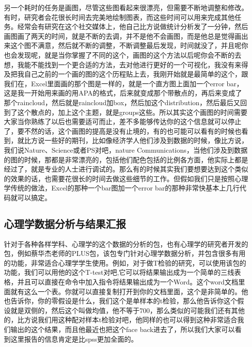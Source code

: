 \documentclass[
  oneside]{book}
\begin{document}
另一个耗时的任务是画图，尽管这些图看起来很漂亮，但需要不断地调整和修改。有时，研究者会花很长时间去完美地绘制图表，而这些时间可以用来完成其他任务。经常会有研究在这个社交媒体上，他自己比方说做统计分析发了一分钟，然后画图画了两天的时间，就是不断的去调，并不是他不会画图，而是他总是觉得画出来这个图不满意，然后就不断的调整，不断调整最后发现，时间就没了，并且呢你也会发现呢，就是当你掌握了不同的这个，画图的这个方法以后呢你会不断的去想，我能不能找到一个更合适的方法，去对他进行更好的一个可视化，我没有来得及把我自己之前的一个画的图的这个历程贴上去，我刚开始就是最简单的这个，跟我们在，Excel里面画的那个图是一样的，就是一个直方图上面加一个error bar，这是我一开始用来画的用APA的格式，后来就变成那个带散点的，再后来变成了那个raincloud，然后就是raincloud加box，然后加这个distribution，然后最后又回到了这个散点的，加上这个主题，就是groups这些。所以其实这个画图的时间需要大家当你熟练了以后也需要适可而止，差不多能够传达你的这个信息就可以停止了，要不然的话，这个画图的提高是没有止境的，有的也可能可以看有的时候也看到，就比方说一些好的期刊，比如像经济学人他们涉及到数据的时候，像比方说，我们说Nature、Science或者PS对吧，nature Communications，当他们涉及到数据的图的时候，那都是非常漂亮的，包括他们配色包括的比例各方面，他实际上都是经过了，就是专业的人士进行调试的。那么有的时候其实我们要想要达到这个类似的效果的话，也需要花很长的时间去做这些细节的工作。但假如我们只是按照心理学传统的做法，Excel的那种一个bar图加一个error bar的那种非常快基本上几行代码就可以搞定。

\hypertarget{ux5fc3ux7406ux5b66ux6570ux636eux5206ux6790ux4e0eux7ed3ux679cux6c47ux62a5}{%
\subsection{心理学数据分析与结果汇报}\label{ux5fc3ux7406ux5b66ux6570ux636eux5206ux6790ux4e0eux7ed3ux679cux6c47ux62a5}}

针对于各种各样学科、心理学的这个数据的分析的包，也有心理学的研究者开发的包，例如蔡华杰老师的PLUS包，该包专门针对心理学数据分析，并包含很多有用的功能，非常适合心理学学生使用。例如，对于做T检验的研究，可以使用该包的功能，我们可以用他的这个T-test对吧,它可以将结果输出成为一个简单的三线表格，并且可以直接在命令中加入指令将结果输出成为一个Word。这个word文档里面就有这么一个表。你就可以直接复制打开到你的文档里面，这个是非简单的。他也告诉你，你的零假设是什么，我们这个是单样本的t检验，那么他告诉你这个假设就是双侧的，然后这个叫做均值，他不等于700，那么类似的可能我们还有其他的，比方说我们用这种配对样本t检验对吧，他同样的也可以得到这种非常适合我们输出的这个结果，而且他最近也把这个face back进去了，所以我们大家可以看到这里报告的信息肯定是比spss更加全面的。
\end{document}
